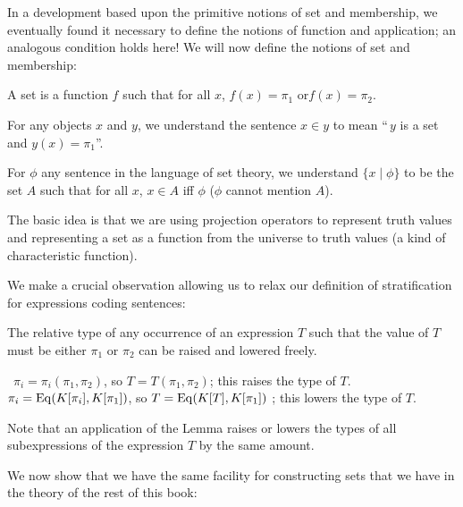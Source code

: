 In a development based upon the primitive notions of set and
membership, we eventually found it necessary to define the
notions of function and application; an analogous condition
holds here!  We will now define the notions of set and membership:

\begin{definition}
 A {\upshape set\/} is a function $f$ such that for all
 $x$, $f(x)=\pi_1$ or\linebreak $f(x) = \pi_2$.
\end{definition}

\begin{definition}
 For any objects $x$ and $y$, we understand the
 sentence $x \in y$ to mean ``$\,y$ is a set and $y(x) = \pi_1\!$''.
\end{definition}

\begin{definition}
 For $\phi$ any sentence in the language of set theory, we understand
 $\{x\mid\phi\}$ to be the set $A$ such that for all $x$, $x \in A$ iff
 $\phi$ ($\phi$ cannot mention $A$).
\end{definition}

The basic idea is that we are using projection operators to represent
truth values and representing a set as a function from the
universe to 
truth values (a kind of characteristic
function). 

We make a crucial observation allowing us to relax our definition of
stratification for expressions coding sentences:

\begin{lemme}
 The relative type of any occurrence of an expression
 $T$ such that the value of $T$ must be either $\pi_1$ or $\pi_2$ can be raised
 and lowered freely.
\end{lemme}

\preuve\ $\pi_i = \pi_i(\pi_1,\pi_2)$, so $T =
T(\pi_1,\pi_2)$; this raises the type of $T$.  $\pi_i =
\mathop{\mathrm{Eq}}(K[\pi_i],K[\pi_1])$, so $T = \mathop{\mathrm{Eq}}(K[T],K[\pi_1])$ ; this
lowers the type of $T$.
\finpreuve

Note that an application of the Lemma raises or lowers the types of all subexpressions of the expression $T$ by the same amount.

We now show that we have the same facility for constructing sets that
we have in the theory of the rest of this book:

